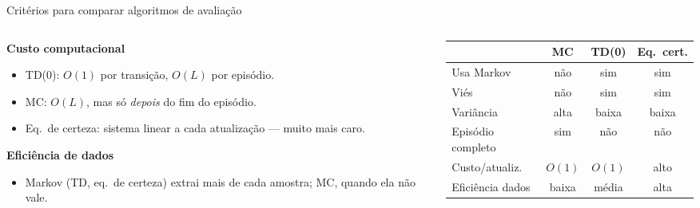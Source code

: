\documentclass[aspectratio=169, 11pt]{beamer}
\begin{document}
\begin{frame}{Critérios para comparar algoritmos de avaliação}

  \begin{columns}[T]
    \begin{column}{0.52\textwidth}
      \textbf{Custo computacional}
      \begin{itemize}\setlength{\itemsep}{0.2ex}
        \item TD(0): $O(1)$ por transição, $O(L)$ por episódio.
        \item MC: $O(L)$, mas só \emph{depois} do fim do episódio.
        \item Eq.\ de certeza: sistema linear a cada atualização — muito
          mais caro.
      \end{itemize}

      \smallskip
      \textbf{Eficiência de dados}
      \begin{itemize}\setlength{\itemsep}{0.2ex}
        \item Markov (TD, eq.\ de certeza) extrai mais de cada amostra; MC,
          quando ela não vale.
      \end{itemize}
    \end{column}
    \begin{column}{0.48\textwidth}
      \begin{center}\footnotesize
      \begin{tabular}{lccc}
        \toprule
        & MC & TD(0) & Eq.\ cert. \\
        \midrule
        Usa Markov        & não & sim & sim \\
        Viés              & não & sim & sim \\
        Variância         & alta & baixa & baixa \\
        Episódio completo & sim & não & não \\
        Custo/atualiz.    & $O(1)$ & $O(1)$ & alto \\
        Eficiência dados  & baixa & média & alta \\
        \bottomrule
      \end{tabular}
      \end{center}

    \end{column}
  \end{columns}
\end{frame}
\end{document}
